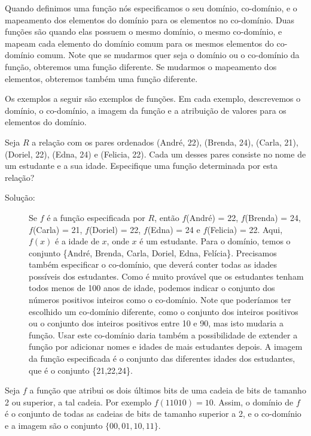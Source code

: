 Quando definimos uma função nós especificamos o seu domínio, co-domínio, e o
mapeamento dos elementos do domínio para os elementos no co-domínio. Duas
funções são  quando elas possuem o mesmo domínio, o mesmo
co-domínio, e mapeam cada elemento do domínio comum para os mesmos elementos do
co-domínio comum. Note que se mudarmos quer seja o domínio ou o co-domínio da
função, obteremos uma função diferente. Se mudarmos o mapeamento dos elementos,
obteremos também uma função diferente.

Os exemplos a seguir são exemplos de funções. Em cada exemplo, descrevemos o
domínio, o co-domínio, a imagem da função e a atribuição de valores para os
elementos do domínio.

\begin{exmp}

Seja $R$ a relação com os pares ordenados (André, 22), (Brenda, 24), (Carla,
21), (Doriel, 22), (Edna, 24) e (Felicia, 22). Cada um desses pares consiste no
nome de um estudante e a sua idade. Especifique uma função determinada por esta
relação?
\begin{description}
\item[Solução:]Se $f$ é a função especificada por $R$, então $f$(André) = 22,
$f$(Brenda) = 24, $f$(Carla) = 21, $f$(Doriel) = 22, $f$(Edna) = 24 e
$f$(Felicia) = 22. Aqui, $f(x)$ é a idade de $x$, onde $x$ é um estudante. Para
o domínio, temos o conjunto \{André, Brenda, Carla, Doriel, Edna, Felícia\}.
Precisamos também especificar o co-domínio, que deverá conter todas as idades
possíveis dos estudantes. Como é muito provável que os estudantes tenham todos
menos de 100 anos de idade, podemos indicar o conjunto dos números positivos
inteiros como o co-domínio. Note que poderíamos ter escolhido um co-domínio
diferente, como o conjunto dos inteiros positivos ou o conjunto dos inteiros
positivos entre 10 e 90, mas isto mudaria a função. Usar este co-domínio daria
também a possibilidade de extender a função por adicionar nomes e idades de mais
estudantes depois. A imagem da função especificada é o conjunto das diferentes
idades dos estudantes, que é o conjunto \{21,22,24\}.
\end{description}
\end{exmp}

\begin{exmp}

Seja $f$ a função que atribui os dois últimos bits de uma cadeia de bits de
tamanho 2 ou superior, a tal cadeia. Por exemplo $f(11010) = 10$. Assim, o
domínio de $f$ é o conjunto de todas as cadeias de bits de tamanho superior a 2,
e o co-domínio e a imagem são o conjunto $\{00,01,10,11\}$.
\end{exmp}

